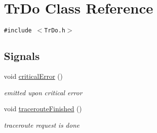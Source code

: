 \hypertarget{classTrDo}{
\section{TrDo Class Reference}
\label{classTrDo}
}
{\tt \#include $<$TrDo.h$>$}

\subsection*{Signals}
\begin{CompactItemize}
\item 
\hypertarget{classTrDo_71b0a7cd37eae74dcc72a844e3d26485}{
void \hyperlink{classTrDo_71b0a7cd37eae74dcc72a844e3d26485}{criticalError} ()}
\label{classTrDo_71b0a7cd37eae74dcc72a844e3d26485}

\begin{CompactList}\small\item\em emitted upon critical error \item\end{CompactList}\item 
\hypertarget{classTrDo_22fbf5ee2a4bf2df9b6bf1d3ddfa8f67}{
void \hyperlink{classTrDo_22fbf5ee2a4bf2df9b6bf1d3ddfa8f67}{tracerouteFinished} ()}
\label{classTrDo_22fbf5ee2a4bf2df9b6bf1d3ddfa8f67}

\begin{CompactList}\small\item\em traceroute request is done \item\end{CompactList}\end{CompactItemize}
